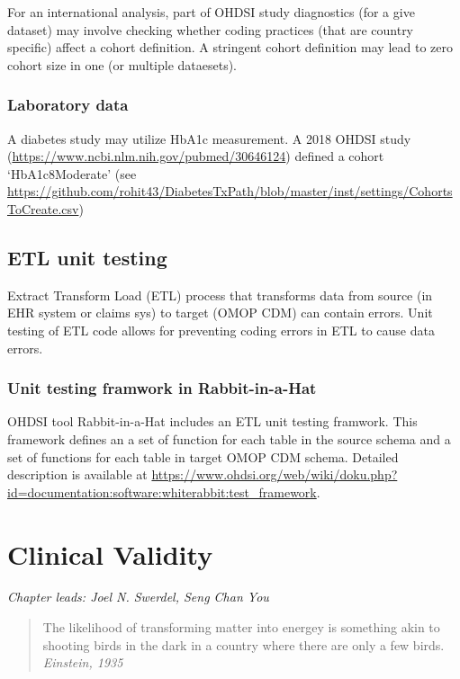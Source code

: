 \documentclass[11pt]{book}
\theoremstyle{definition}
\theoremstyle{definition}
\theoremstyle{definition}
\theoremstyle{remark}
\begin{document}
For an international analysis, part of OHDSI study diagnostics (for a give dataset) may involve checking whether coding practices (that are country specific) affect a cohort definition. A stringent cohort definition may lead to zero cohort size in one (or multiple dataesets).

\hypertarget{laboratory-data}{%
\subsection{Laboratory data}\label{laboratory-data}}

A diabetes study may utilize HbA1c measurement. A 2018 OHDSI study (\url{https://www.ncbi.nlm.nih.gov/pubmed/30646124}) defined a cohort `HbA1c8Moderate' (see \url{https://github.com/rohit43/DiabetesTxPath/blob/master/inst/settings/CohortsToCreate.csv})

\hypertarget{etl-unit-testing}{%
\section{ETL unit testing}\label{etl-unit-testing}}

Extract Transform Load (ETL) process that transforms data from source (in EHR system or claims sys) to target (OMOP CDM) can contain errors. Unit testing of ETL code allows for preventing coding errors in ETL to cause data errors.

\hypertarget{unit-testing-framwork-in-rabbit-in-a-hat}{%
\subsection{Unit testing framwork in Rabbit-in-a-Hat}\label{unit-testing-framwork-in-rabbit-in-a-hat}}

OHDSI tool Rabbit-in-a-Hat includes an ETL unit testing framwork. This framework defines an a set of function for each table in the source schema and a set of functions for each table in target OMOP CDM schema. Detailed description is available at \url{https://www.ohdsi.org/web/wiki/doku.php?id=documentation:software:whiterabbit:test_framework}.

\hypertarget{ClinicalValidity}{%
\chapter{Clinical Validity}\label{ClinicalValidity}}

\emph{Chapter leads: Joel N. Swerdel, Seng Chan You}

\begin{quote}
The likelihood of transforming matter into energey is something akin to shooting birds in the dark in a country where there are only a few birds. \emph{Einstein, 1935}
\end{quote}
\end{document}

